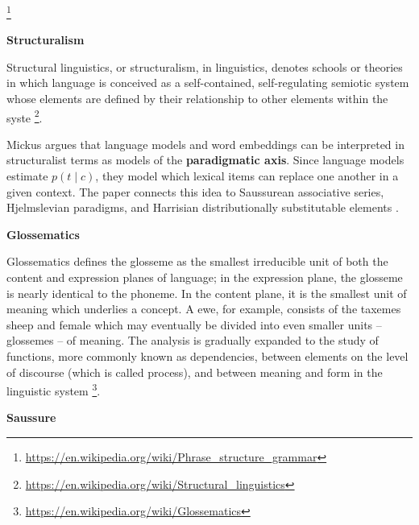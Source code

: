 \documentclass{book}
\providecommand{\ProjectDeepHeading}[2]{%
    \par\medskip\noindent\textbf{#2}\par\smallskip
}
\providecommand{\seeherefooter}[1]{\footnote{\url{#1}}}
\begin{document}
\seeherefooter{https://en.wikipedia.org/wiki/Phrase_structure_grammar}

\ProjectDeepHeading{5}{Structuralism}


Structural linguistics, or structuralism, in linguistics, denotes schools or theories in which language is conceived as a self-contained, self-regulating semiotic system whose elements are defined by their relationship to other elements within the syste \seeherefooter{https://en.wikipedia.org/wiki/Structural_linguistics}.


\cite{mickus-2024-language-models-and-the-paradigmatic-axis} Mickus argues that language models and word embeddings can be interpreted in structuralist terms as models of the \textbf{paradigmatic axis}. Since language models estimate \(p(t \mid c)\), they model which lexical items can replace one another in a given context. The paper connects this idea to Saussurean associative series, Hjelmslevian paradigms, and Harrisian distributionally substitutable elements \cite{mickus-2024-language-models-and-the-paradigmatic-axis}.

\ProjectDeepHeading{6}{Glossematics}


Glossematics defines the glosseme as the smallest irreducible unit of both the content and expression planes of language; in the expression plane, the glosseme is nearly identical to the phoneme. In the content plane, it is the smallest unit of meaning which underlies a concept. A ewe, for example, consists of the taxemes sheep and female which may eventually be divided into even smaller units – glossemes – of meaning. The analysis is gradually expanded to the study of functions, more commonly known as dependencies, between elements on the level of discourse (which is called process), and between meaning and form in the linguistic system  \seeherefooter{https://en.wikipedia.org/wiki/Glossematics}.

\ProjectDeepHeading{6}{Saussure}

\end{document}
